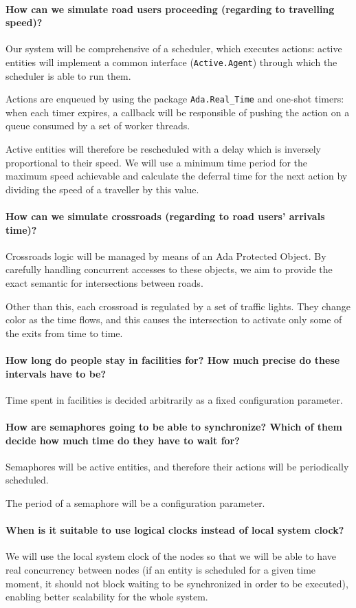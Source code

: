 \paragraph{How can we simulate road users proceeding (regarding to travelling
  speed)?}
Our system will be comprehensive of a scheduler, which executes actions:
active entities will implement a common interface (\texttt{Active.Agent})
through which the scheduler is able to run them.

Actions are enqueued by using the package \texttt{Ada.Real\_Time} and one-shot
timers: when each timer expires, a callback will be responsible of pushing the
action on a queue consumed by a set of worker threads.

Active entities will therefore be rescheduled with a delay which is inversely
proportional to their speed. We will use a minimum time period for the maximum
speed achievable and calculate the deferral time for the next action by
dividing the speed of a traveller by this value.

\paragraph{How can we simulate crossroads (regarding to road users' arrivals
  time)?}
Crossroads logic will be managed by means of an Ada Protected Object. By
carefully handling concurrent accesses to these objects, we aim to provide the
exact semantic for intersections between roads.

Other than this, each crossroad is regulated by a set of traffic lights. They
change color as the time flows, and this causes the intersection to activate
only some of the exits from time to time.

\paragraph{How long do people stay in facilities for? How much precise do these
  intervals have to be?}
Time spent in facilities is decided arbitrarily as a fixed configuration
parameter.

\paragraph{How are semaphores going to be able to synchronize? Which of them
  decide how much time do they have to wait for?}
Semaphores will be active entities, and therefore their actions will be
periodically scheduled.

The period of a semaphore will be a configuration parameter.

\paragraph{When is it suitable to use logical clocks instead of local system
  clock?}
We will use the local system clock of the nodes so that we will be able to
have real concurrency between nodes (if an entity is scheduled for a given
time moment, it should not block waiting to be synchronized in order to be
executed), enabling better scalability for the whole system.
